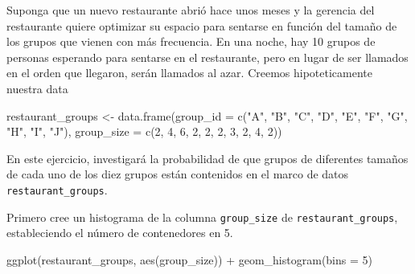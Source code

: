 \documentclass[
  letterpaper,
  DIV=11,
  numbers=noendperiod]{scrreprt}
\newenvironment{Shaded}{\begin{snugshade}}{\end{snugshade}}
\newcommand{\AttributeTok}[1]{\textcolor[rgb]{0.40,0.45,0.13}{#1}}
\newcommand{\DecValTok}[1]{\textcolor[rgb]{0.68,0.00,0.00}{#1}}
\newcommand{\FunctionTok}[1]{\textcolor[rgb]{0.28,0.35,0.67}{#1}}
\newcommand{\NormalTok}[1]{\textcolor[rgb]{0.00,0.23,0.31}{#1}}
\newcommand{\OtherTok}[1]{\textcolor[rgb]{0.00,0.23,0.31}{#1}}
\newcommand{\SpecialCharTok}[1]{\textcolor[rgb]{0.37,0.37,0.37}{#1}}
\newcommand{\StringTok}[1]{\textcolor[rgb]{0.13,0.47,0.30}{#1}}
\begin{document}
Suponga que un nuevo restaurante abrió hace unos meses y la gerencia del
restaurante quiere optimizar su espacio para sentarse en función del
tamaño de los grupos que vienen con más frecuencia. En una noche, hay 10
grupos de personas esperando para sentarse en el restaurante, pero en
lugar de ser llamados en el orden que llegaron, serán llamados al azar.
Creemos hipoteticamente nuestra data

\begin{Shaded}
\begin{Highlighting}[]
\NormalTok{restaurant\_groups }\OtherTok{\textless{}{-}} \FunctionTok{data.frame}\NormalTok{(}\AttributeTok{group\_id =} \FunctionTok{c}\NormalTok{(}\StringTok{"A"}\NormalTok{, }\StringTok{"B"}\NormalTok{, }\StringTok{"C"}\NormalTok{, }\StringTok{"D"}\NormalTok{, }\StringTok{"E"}\NormalTok{, }\StringTok{"F"}\NormalTok{, }\StringTok{"G"}\NormalTok{, }\StringTok{"H"}\NormalTok{, }\StringTok{"I"}\NormalTok{, }\StringTok{"J"}\NormalTok{), }\AttributeTok{group\_size =} \FunctionTok{c}\NormalTok{(}\DecValTok{2}\NormalTok{, }\DecValTok{4}\NormalTok{, }\DecValTok{6}\NormalTok{, }\DecValTok{2}\NormalTok{, }\DecValTok{2}\NormalTok{, }\DecValTok{2}\NormalTok{, }\DecValTok{3}\NormalTok{, }\DecValTok{2}\NormalTok{, }\DecValTok{4}\NormalTok{, }\DecValTok{2}\NormalTok{))}
\end{Highlighting}
\end{Shaded}

En este ejercicio, investigará la probabilidad de que grupos de
diferentes tamaños de cada uno de los diez grupos están contenidos en el
marco de datos \texttt{restaurant\_groups}.

Primero cree un histograma de la columna \texttt{group\_size} de
\texttt{restaurant\_groups}, estableciendo el número de contenedores en
5.

\begin{Shaded}
\begin{Highlighting}[]
\FunctionTok{ggplot}\NormalTok{(restaurant\_groups, }\FunctionTok{aes}\NormalTok{(group\_size)) }\SpecialCharTok{+}
  \FunctionTok{geom\_histogram}\NormalTok{(}\AttributeTok{bins =} \DecValTok{5}\NormalTok{)}
\end{Highlighting}
\end{Shaded}
\end{document}
